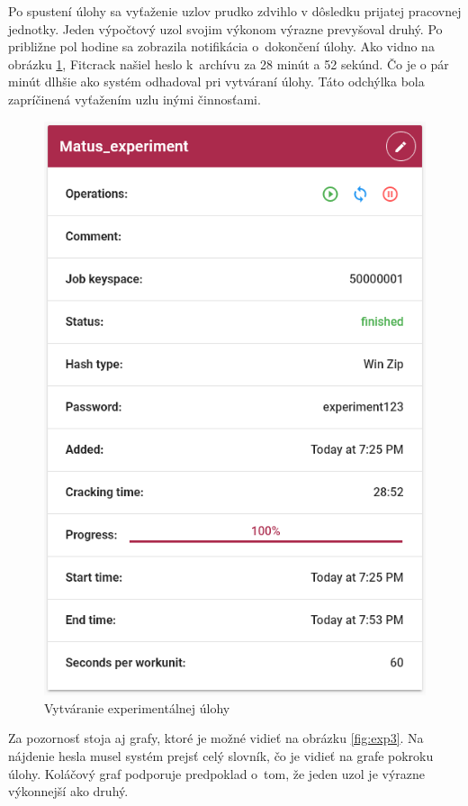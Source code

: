 \documentclass[slovak]{fitthesis}
\begin{document}
\noindent
Po spustení úlohy sa vyťaženie uzlov prudko zdvihlo v dôsledku prijatej pracovnej jednotky. Jeden výpočtový uzol svojim výkonom výrazne prevyšoval druhý. Po približne pol hodine sa zobrazila notifikácia o~dokončení úlohy. Ako vidno na obrázku \ref{fig:exp2}, Fitcrack našiel heslo k~archívu za 28 minút a 52 sekúnd. Čo je o pár minút dlhšie ako systém odhadoval pri vytváraní úlohy. Táto odchýlka bola zapríčinená vyťažením uzlu inými činnosťami. 
\begin{figure}[H]
    \centering
    \includegraphics[scale=0.6]{obrazky/exp2.PNG}
    \caption{Vytváranie experimentálnej úlohy}
    \label{fig:exp2}
\end{figure}
\noindent
Za pozornosť stoja aj grafy, ktoré je možné vidieť na obrázku \ref{fig:exp3}. Na nájdenie hesla musel systém prejsť celý slovník, čo je vidieť na grafe pokroku úlohy. Koláčový graf podporuje predpoklad o~tom, že jeden uzol je výrazne výkonnejší ako druhý. 
\end{document}
